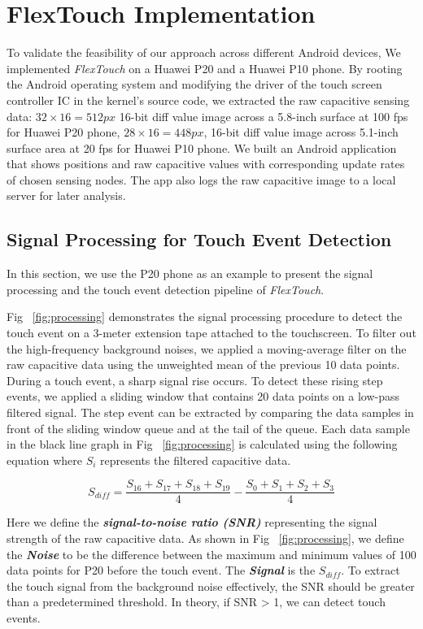 \chapter{FlexTouch Implementation}

To validate the feasibility of our approach across different Android devices, We implemented \textit{FlexTouch} on a Huawei P20 and a Huawei P10 phone. By rooting the Android operating system and modifying the driver of the touch screen controller IC in the kernel's source code, we extracted the raw capacitive sensing data: $32 \times 16 = 512 px$ 16-bit diff value image across a 5.8-inch surface at 100 fps for Huawei P20 phone, $28 \times 16 = 448 px$, 16-bit diff value image across 5.1-inch surface area at 20 fps for Huawei P10 phone. We built an Android application that shows positions and raw capacitive values with corresponding update rates of chosen sensing nodes. The app also logs the raw capacitive image to a local server for later analysis.

\section{Signal Processing for Touch Event Detection}
In this section, we use the P20 phone as an example to present the signal processing and the touch event detection pipeline of \textit{FlexTouch}. 

Fig ~\ref{fig:processing} demonstrates the signal processing procedure to detect the touch event on a 3-meter extension tape attached to the touchscreen. To filter out the high-frequency background noises, we applied a moving-average filter on the raw capacitive data using the unweighted mean of the previous 10 data points. During a touch event, a sharp signal rise occurs. To detect these rising step events, we applied a sliding window that contains 20 data points on a low-pass filtered signal. The step event can be extracted by comparing the data samples in front of the sliding window queue and at the tail of the queue. Each data sample in the black line graph in Fig ~\ref{fig:processing} is calculated using the following equation where $S_{i}$ represents the filtered capacitive data. 

\begin{equation}
    S_{diff} = \frac{S_{16} + S_{17} + S_{18} + S_{19}}{4}  - \frac{S_{0} + S_{1} + S_{2} + S_{3}}{4}
\end{equation}

Here we define the \textbf{\textit{signal-to-noise ratio (SNR)}} representing the signal strength of the raw capacitive data. As shown in Fig ~\ref{fig:processing}, we define the \textbf{\textit{Noise}} to be the difference between the maximum and minimum values of 100 data points for P20 before the touch event. The \textbf{\textit{Signal}} is the $S_{diff}$. To extract the touch signal from the background noise effectively, the SNR should be greater than a predetermined threshold. In theory, if SNR > 1, we can detect touch events. 


